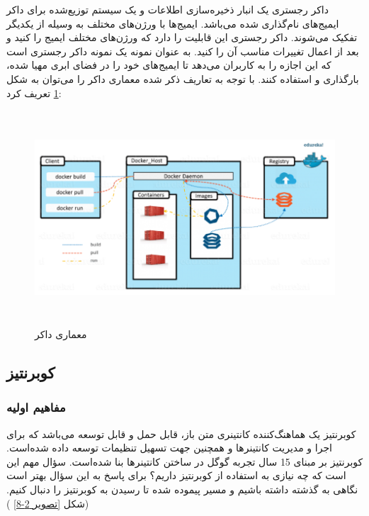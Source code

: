داکر رجستری یک انبار ذخیره‌سازی اطلاعات و یک سیستم توزیع‌شده برای داکر ایمیج‌های نام‌گذاری شده می‌باشد. ایمیج‌ها با ورژن‌های مختلف به وسیله 
از یکدیگر تفکیک می‌شوند. داکر رجستری این قابلیت را دارد که ورژن‌های مختلف ایمیج را
کنید و بعد از اعمال تغییرات مناسب آن را 
کنید. به عنوان نمونه 
یک نمونه داکر رجستری است که این اجازه را به کاربران می‌دهد تا ایمیج‌های خود را در فضای ابری مهیا شده، بارگذاری و استفاده کنند.
\newline
\newline
با توجه به تعاریف ذکر شده معماری داکر را می‌توان به شکل 
\ref{تصویر 2-7}
تعریف کرد:
\begin{figure}[!h]
	\centering
	\includegraphics[height=8cm]{fig2-7}
	\caption{معماری داکر}
	\label{تصویر 2-7}
\end{figure}


\subsection{کوبرنتیز}

\subsubsection{مفاهیم اولیه}

کوبرنتیز یک هماهنگ‌کننده کانتینری متن باز، قابل حمل و قابل توسعه می‌باشد که برای اجرا و مدیریت کانتینرها و همچنین جهت تسهیل تنظیمات توسعه داده شده‌است. کوبرنتیز بر مبنای 15 سال تجربه گوگل در ساختن کانتینرها بنا شده‌است.
سؤال مهم این است که چه نیازی به استفاده از کوبرنتیز داریم؟ برای پاسخ به این سؤال بهتر است نگاهی به گذشته داشته باشیم و مسیر پیموده شده تا رسیدن به کوبرنتیز را دنبال کنیم.(شکل
\ref{تصویر 2-8}
)


